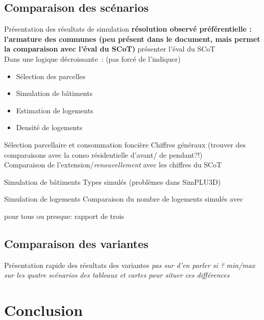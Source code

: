 \documentclass[xcolor=table]{beamer}
\begin{document}
\subsection{Comparaison des scénarios}

\begin{frame}{Présentation des résultats de simulation}
	\textbf{résolution observé préférentielle : l'armature des communes (peu présent dans le document, mais permet la comparaison avec l'éval du SCoT)}
	présenter l'éval du SCoT
	\\
	Dans une logique décroissante~: (pas forcé de l'indiquer)
	\begin{itemize}
		\item Sélection des parcelles
		\item Simulation de bâtiments
		\item Estimation de logements
		\item Densité de logements 
	\end{itemize}
\end{frame}

\begin{frame}{Sélection parcellaire et consommation foncière}
Chiffres généraux (trouver des comparaisons avec la conso résidentielle d'avant/ de pendant?!)
\\
Comparaison de l'extension/\textit{renouvellement} avec les chiffres du SCoT 
\end{frame}

\begin{frame}{Simulation de bâtiments}
	Types simulés (problèmes dans SimPLU3D)
\end{frame}

\begin{frame}{Simulation de logements}
	Comparaison du nombre de logements simulés avec 
	
	pour tous ou presque: rapport de trois
\end{frame}

\subsection{Comparaison des variantes}

\begin{frame}{Présentation rapide des résultats des variantes}
\textit{pas sur d'en parler si ?}
	\textit{min/max sur les quatre scénarios des tableaux et cartes pour situer ces différences}
\end{frame}


\section{Conclusion}
\end{document}
